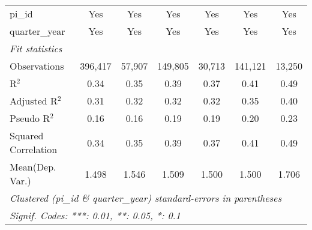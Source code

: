 \begin{tabular}{lcccccc}
   pi\_id                                                     & Yes           & Yes            & Yes           & Yes           & Yes           & Yes\\  
   quarter\_year                                              & Yes           & Yes            & Yes           & Yes           & Yes           & Yes\\  
   \midrule
   \emph{Fit statistics}\\
   Observations                                               & 396,417       & 57,907         & 149,805       & 30,713        & 141,121       & 13,250\\  
   R$^2$                                                      & 0.34          & 0.35           & 0.39          & 0.37          & 0.41          & 0.49\\  
   Adjusted R$^2$                                             & 0.31          & 0.32           & 0.32          & 0.32          & 0.35          & 0.40\\  
   Pseudo R$^2$                                               & 0.16          & 0.16           & 0.19          & 0.19          & 0.20          & 0.23\\  
   Squared Correlation                                        & 0.34          & 0.35           & 0.39          & 0.37          & 0.41          & 0.49\\  
Mean(Dep. Var.) & 1.498 & 1.546 & 1.509 & 1.500 & 1.500 & 1.706 \\
   \midrule \midrule
   \multicolumn{7}{l}{\emph{Clustered (pi\_id \& quarter\_year) standard-errors in parentheses}}\\
   \multicolumn{7}{l}{\emph{Signif. Codes: ***: 0.01, **: 0.05, *: 0.1}}\\
\end{tabular}
\par\endgroup
